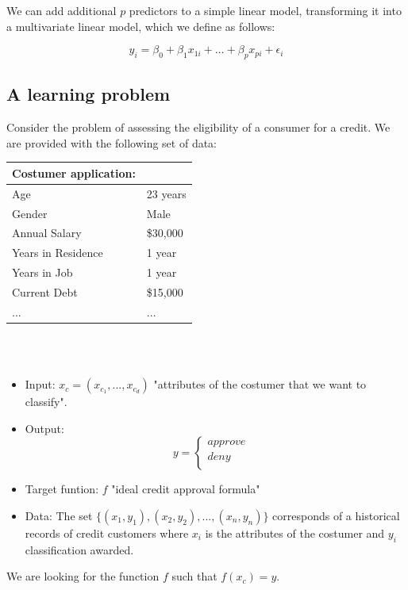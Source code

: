 \documentclass[../main.tex]{subfiles}
\begin{document}
\noindent We can add additional $p$ predictors to a simple linear model, transforming it into a multivariate linear model, which we define as follows:

$$y_i = \beta_0 + \beta_1x_{1i} + \ldots + \beta_px_{pi} + \epsilon_i $$


\subsection{A learning problem}
\noindent Consider the problem of assessing the eligibility of a consumer for a credit. We are provided with the following set of data: \\ 

\begin{tabular}{ll}
	\toprule
	\textbf{Costumer application:}  \\ 
	\midrule
	Age & 23 years \\
	Gender & Male \\
	Annual Salary & \$30,000 \\
	Years in Residence & 1 year \\
	Years in Job & 1 year \\
	Current Debt & \$15,000 \\
	... & ... \\
	\bottomrule
\end{tabular} 
\\ \\
\begin{itemize}
\item Input: \textbf{$x_c=(x_{c_1},...,x_{c_d})$}  "attributes of the costumer that we want to classify". 
\item Output:  
\[
y = \begin{cases}
	approve \\
	deny& \\
\end{cases}
\]

\item Target funtion: $f$  "ideal credit approval formula"
\item Data: The set $\{(x_1, y_1),(x_2,y_2),...,(x_n ,y_n)\}$ corresponds of a historical records of credit customers where $x_i$ is the attributes of the costumer and $y_i$ classification awarded.
\end{itemize}

\noindent We are looking for the function $f$ such that $f(x_c)=y$.
\\ \\ 
\end{document}
